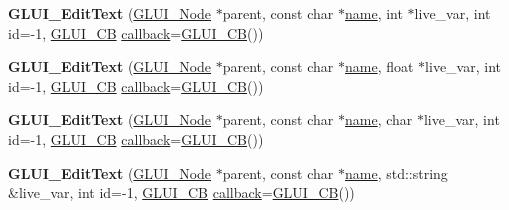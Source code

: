 \begin{DoxyCompactItemize}
\item 
\hypertarget{class_g_l_u_i___edit_text_acde777046eb65672c70c51b5728e7c3f}{{\bfseries G\+L\+U\+I\+\_\+\+Edit\+Text} (\hyperlink{class_g_l_u_i___node}{G\+L\+U\+I\+\_\+\+Node} $\ast$parent, const char $\ast$\hyperlink{class_g_l_u_i___control_aa95b97d50df45335fc33f0af03958eb3}{name}, int $\ast$live\+\_\+var, int id=-\/1, \hyperlink{class_g_l_u_i___c_b}{G\+L\+U\+I\+\_\+\+C\+B} \hyperlink{class_g_l_u_i___control_a96060fe0cc6d537e736dd6eef78e24ab}{callback}=\hyperlink{class_g_l_u_i___c_b}{G\+L\+U\+I\+\_\+\+C\+B}())}\label{class_g_l_u_i___edit_text_acde777046eb65672c70c51b5728e7c3f}

\item 
\hypertarget{class_g_l_u_i___edit_text_adad7d18bc05da4e6aecfea680c0a0a65}{{\bfseries G\+L\+U\+I\+\_\+\+Edit\+Text} (\hyperlink{class_g_l_u_i___node}{G\+L\+U\+I\+\_\+\+Node} $\ast$parent, const char $\ast$\hyperlink{class_g_l_u_i___control_aa95b97d50df45335fc33f0af03958eb3}{name}, float $\ast$live\+\_\+var, int id=-\/1, \hyperlink{class_g_l_u_i___c_b}{G\+L\+U\+I\+\_\+\+C\+B} \hyperlink{class_g_l_u_i___control_a96060fe0cc6d537e736dd6eef78e24ab}{callback}=\hyperlink{class_g_l_u_i___c_b}{G\+L\+U\+I\+\_\+\+C\+B}())}\label{class_g_l_u_i___edit_text_adad7d18bc05da4e6aecfea680c0a0a65}

\item 
\hypertarget{class_g_l_u_i___edit_text_a85fadf933a22982801659cec28d159f1}{{\bfseries G\+L\+U\+I\+\_\+\+Edit\+Text} (\hyperlink{class_g_l_u_i___node}{G\+L\+U\+I\+\_\+\+Node} $\ast$parent, const char $\ast$\hyperlink{class_g_l_u_i___control_aa95b97d50df45335fc33f0af03958eb3}{name}, char $\ast$live\+\_\+var, int id=-\/1, \hyperlink{class_g_l_u_i___c_b}{G\+L\+U\+I\+\_\+\+C\+B} \hyperlink{class_g_l_u_i___control_a96060fe0cc6d537e736dd6eef78e24ab}{callback}=\hyperlink{class_g_l_u_i___c_b}{G\+L\+U\+I\+\_\+\+C\+B}())}\label{class_g_l_u_i___edit_text_a85fadf933a22982801659cec28d159f1}

\item 
\hypertarget{class_g_l_u_i___edit_text_a721bd71256ee84de33682e0bf926e6a3}{{\bfseries G\+L\+U\+I\+\_\+\+Edit\+Text} (\hyperlink{class_g_l_u_i___node}{G\+L\+U\+I\+\_\+\+Node} $\ast$parent, const char $\ast$\hyperlink{class_g_l_u_i___control_aa95b97d50df45335fc33f0af03958eb3}{name}, std\+::string \&live\+\_\+var, int id=-\/1, \hyperlink{class_g_l_u_i___c_b}{G\+L\+U\+I\+\_\+\+C\+B} \hyperlink{class_g_l_u_i___control_a96060fe0cc6d537e736dd6eef78e24ab}{callback}=\hyperlink{class_g_l_u_i___c_b}{G\+L\+U\+I\+\_\+\+C\+B}())}\label{class_g_l_u_i___edit_text_a721bd71256ee84de33682e0bf926e6a3}


\end{DoxyCompactItemize}
